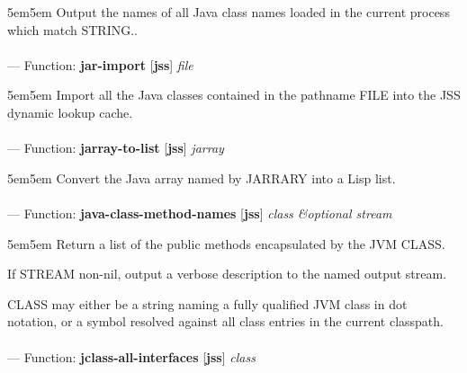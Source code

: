 \begin{adjustwidth}{5em}{5em}
Output the names of all Java class names loaded in the current process which match STRING..
\end{adjustwidth}

\paragraph{}
\label{JSS:JAR-IMPORT}
--- Function: \textbf{jar-import} [\textbf{jss}] \textit{file}

\begin{adjustwidth}{5em}{5em}
Import all the Java classes contained in the pathname FILE into the JSS dynamic lookup cache.
\end{adjustwidth}

\paragraph{}
\label{JSS:JARRAY-TO-LIST}
--- Function: \textbf{jarray-to-list} [\textbf{jss}] \textit{jarray}

\begin{adjustwidth}{5em}{5em}
Convert the Java array named by JARRARY into a Lisp list.
\end{adjustwidth}

\paragraph{}
\label{JSS:JAVA-CLASS-METHOD-NAMES}
--- Function: \textbf{java-class-method-names} [\textbf{jss}] \textit{class \&optional stream}

\begin{adjustwidth}{5em}{5em}
Return a list of the public methods encapsulated by the JVM CLASS.

If STREAM non-nil, output a verbose description to the named output stream.

CLASS may either be a string naming a fully qualified JVM class in dot
notation, or a symbol resolved against all class entries in the
current classpath.
\end{adjustwidth}

\paragraph{}
\label{JSS:JCLASS-ALL-INTERFACES}
--- Function: \textbf{jclass-all-interfaces} [\textbf{jss}] \textit{class}

